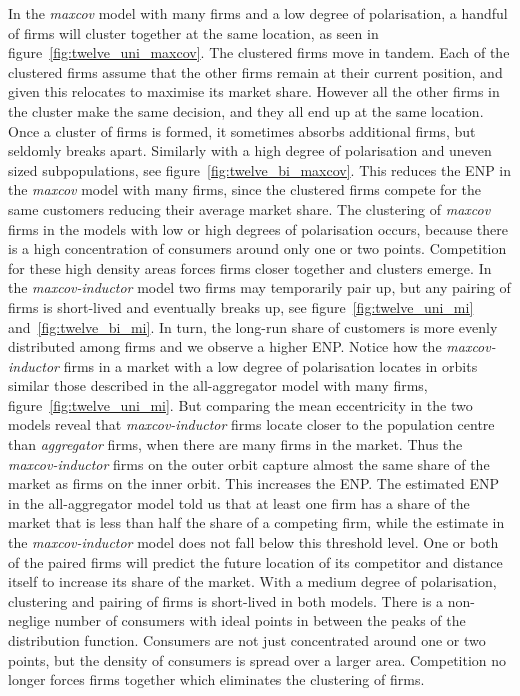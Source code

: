 \documentclass[preprint, 12pt]{elsarticle}
\begin{document}
In the \emph{maxcov} model with many firms and a low degree of polarisation, a handful of firms will cluster together at the same location, as seen in figure~\ref{fig:twelve_uni_maxcov}. The clustered firms move in tandem. Each of the clustered firms assume that the other firms remain at their current position, and given this relocates to maximise its market share. However all the other firms in the cluster make the same decision, and they all end up at the same location. Once a cluster of firms is formed, it sometimes absorbs additional firms, but seldomly breaks apart. Similarly with a high degree of polarisation and uneven sized subpopulations, see figure~\ref{fig:twelve_bi_maxcov}. This reduces the ENP in the \emph{maxcov} model with many firms, since the clustered firms compete for the same customers reducing their average market share. The clustering of \emph{maxcov} firms in the models with low or high degrees of polarisation occurs, because there is a high concentration of consumers around only one or two points. Competition for these high density areas forces firms closer together and clusters emerge. In the \emph{maxcov-inductor} model two firms may temporarily pair up, but any pairing of firms is short-lived and eventually breaks up, see figure~\ref{fig:twelve_uni_mi} and~\ref{fig:twelve_bi_mi}. In turn, the long-run share of customers is more evenly distributed among firms and we observe a higher ENP. Notice how the \emph{maxcov-inductor} firms in a market with a low degree of polarisation locates in orbits similar those described in the all-aggregator model with many firms, figure~\ref{fig:twelve_uni_mi}. But comparing the mean eccentricity in the two models reveal that \emph{maxcov-inductor} firms locate closer to the population centre than \emph{aggregator} firms, when there are many firms in the market. Thus the \emph{maxcov-inductor} firms on the outer orbit capture almost the same share of the market as firms on the inner orbit. This increases the ENP. The estimated ENP in the all-aggregator model told us that at least one firm has a share of the market that is less than half the share of a competing firm, while the estimate in the \emph{maxcov-inductor} model does not fall below this threshold level. One or both of the paired firms will predict the future location of its competitor and distance itself to increase its share of the market. With a medium degree of polarisation, clustering and pairing of firms is short-lived in both models. There is a non-neglige number of consumers with ideal points in between the peaks of the distribution function. Consumers are not just concentrated around one or two points, but the density of consumers is spread over a larger area. Competition no longer forces firms together which eliminates the clustering of firms.
\end{document}
